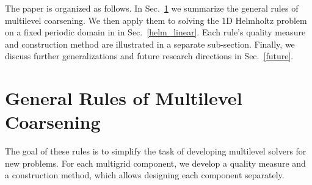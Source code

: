 \documentclass{article}
\begin{document}
The paper is organized as follows. In Sec.~\ref{rules} we summarize the general rules of multilevel coarsening. We then apply them to solving the 1D Helmholtz problem on a fixed periodic domain in in Sec.~\ref{helm_linear}. Each rule's quality measure and construction method are illustrated in a separate sub-section. Finally, we discuss further generalizations and future research directions in Sec.~\ref{future}.

\section{General Rules of Multilevel Coarsening}
\label{rules}
The goal of these rules is to simplify the task of developing multilevel solvers for new problems. For each multigrid component, we develop a quality measure and a construction method, which allows designing each component separately.

\end{document}
